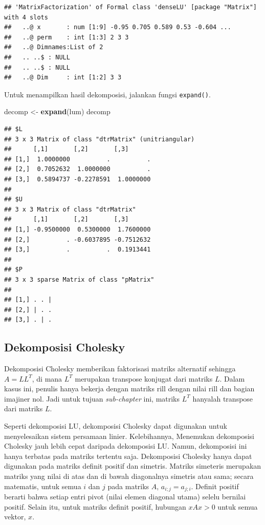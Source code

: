\documentclass[]{book}
\newenvironment{Shaded}{\begin{snugshade}}{\end{snugshade}}
\newcommand{\KeywordTok}[1]{\textcolor[rgb]{0.13,0.29,0.53}{\textbf{#1}}}
\newcommand{\NormalTok}[1]{#1}
\newcommand{\StringTok}[1]{\textcolor[rgb]{0.31,0.60,0.02}{#1}}
\theoremstyle{definition}
\theoremstyle{definition}
\theoremstyle{definition}
\theoremstyle{remark}
\begin{document}
\begin{verbatim}
## 'MatrixFactorization' of Formal class 'denseLU' [package "Matrix"] with 4 slots
##   ..@ x       : num [1:9] -0.95 0.705 0.589 0.53 -0.604 ...
##   ..@ perm    : int [1:3] 2 3 3
##   ..@ Dimnames:List of 2
##   .. ..$ : NULL
##   .. ..$ : NULL
##   ..@ Dim     : int [1:2] 3 3
\end{verbatim}

Untuk menampilkan hasil dekomposisi, jalankan fungsi \texttt{expand()}.

\begin{Shaded}
\begin{Highlighting}[]
\NormalTok{decomp <-}\StringTok{ }\KeywordTok{expand}\NormalTok{(lum)}
\NormalTok{decomp}
\end{Highlighting}
\end{Shaded}

\begin{verbatim}
## $L
## 3 x 3 Matrix of class "dtrMatrix" (unitriangular)
##      [,1]       [,2]       [,3]      
## [1,]  1.0000000          .          .
## [2,]  0.7052632  1.0000000          .
## [3,]  0.5894737 -0.2278591  1.0000000
## 
## $U
## 3 x 3 Matrix of class "dtrMatrix"
##      [,1]       [,2]       [,3]      
## [1,] -0.9500000  0.5300000  1.7600000
## [2,]          . -0.6037895 -0.7512632
## [3,]          .          .  0.1913441
## 
## $P
## 3 x 3 sparse Matrix of class "pMatrix"
##           
## [1,] . . |
## [2,] | . .
## [3,] . | .
\end{verbatim}

\hypertarget{dekomposisi-cholesky}{%
\subsection{Dekomposisi Cholesky}\label{dekomposisi-cholesky}}

Dekomposisi Cholesky memberikan faktorisasi matriks alternatif sehingga \(A = LL^T\), di mana \(L^T\) merupakan transpose konjugat dari matriks \(L\). Dalam kasus ini, penulis hanya bekerja dengan matriks rill dengan nilai rill dan bagian imajiner nol. Jadi untuk tujuan \emph{sub-chapter} ini, matriks \(L^T\) hanyalah transpose dari matriks \(L\).

Seperti dekomposisi LU, dekomposisi Cholesky dapat digunakan untuk menyelesaikan sistem persamaan linier. Kelebihannya, Menemukan dekomposisi Cholesky jauh lebih cepat daripada dekomposisi LU. Namun, dekomposisi ini hanya terbatas pada matriks tertentu saja. Dekomposisi Cholesky hanya dapat digunakan pada matriks definit positif dan simetris. Matriks simeteris merupakan matriks yang nilai di atas dan di bawah diagonalnya simetris atau sama; secara matematis, untuk semua \(i\) dan \(j\) pada matriks \(A\), \(a_{i;j}=a_{j;i}\). Definit positif berarti bahwa setiap entri pivot (nilai elemen diagonal utama) selelu bernilai positif. Selain itu, untuk matriks definit positif, hubungan \(xAx>0\) untuk semua vektor, \(x\).
\end{document}
